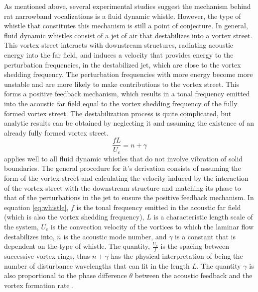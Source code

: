 \documentclass[twocolumn, prl]{revtex4}
\begin{document}
As mentioned above, several experimental studies suggest the mechanism behind rat narrowband vocalizations is a fluid dynamic whistle. However, the type of whistle that constitutes this mechanism is still a point of conjecture. In general, fluid dynamic whistles consist of a jet of air that destabilizes into a vortex street. This vortex street interacts with downstream structures, radiating acoustic energy into the far field, and induces a velocity that provides energy to the perturbation frequencies, in the destabilized jet, which are close to the vortex shedding frequency. The perturbation frequencies with more energy become more unstable and are more likely to make contributions to the vortex street. This forms a positive feedback mechanism, which results in a tonal frequency emitted into the acoustic far field equal to the vortex shedding frequency of the fully formed vortex street. The destabilization process is quite complicated, but analytic results can be obtained by neglecting it and assuming the existence of an already fully formed vortex street.
\begin{equation}
\label{eq:whistle}
\frac{fL}{U_{c}}=n+\gamma
\end{equation}
applies well to all fluid dynamic whistles that do not involve vibration of solid boundaries. The general procedure for it's derivation consists of assuming the form of the vortex street and calculating the velocity induced by the interaction of the vortex street with the downstream structure and matching its phase to that of the perturbations in the jet to ensure the positive feedback mechanism. In equation \ref{eq:whistle}, $f$ is the tonal frequency emitted in the acoustic far field (which is also the vortex shedding frequency), $L$ is a characteristic length scale of the system, $U_c$ is the convection velocity of the vortices to which the laminar flow destabilizes into, $n$ is the acoustic mode number, and $\gamma$ is a constant that is dependent on the type of whistle. The quantity, $\frac{U_c}{f}$ is the spacing between successive vortex rings, thus $n+\gamma$ has the physical interpretation of being the number of disturbance wavelengths that can fit in the length $L$. The quantity $\gamma$ is also proportional to the phase difference $\theta$ between the acoustic feedback and the vortex formation rate \cite{Howe2008,Blake1986}.
\end{document}
